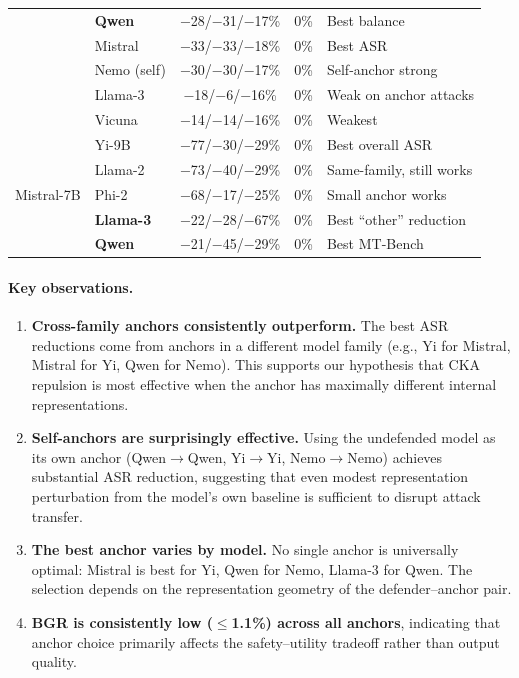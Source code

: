 \begin{table}[h]
\begin{tabular}{@{}llccl@{}}
  & \textbf{Qwen} & $-$28/$-$31/$-$17\% & 0\% & Best balance \\
  & Mistral & $-$33/$-$33/$-$18\% & 0\% & Best ASR \\
  & Nemo (self) & $-$30/$-$30/$-$17\% & 0\% & Self-anchor strong \\
  & Llama-3 & $-$18/$-$6/$-$16\% & 0\% & Weak on anchor attacks \\
  & Vicuna & $-$14/$-$14/$-$16\% & 0\% & Weakest \\
\midrule
\multirow{5}{*}{Mistral-7B}
  & Yi-9B & $-$77/$-$30/$-$29\% & 0\% & Best overall ASR \\
  & Llama-2 & $-$73/$-$40/$-$29\% & 0\% & Same-family, still works \\
  & Phi-2 & $-$68/$-$17/$-$25\% & 0\% & Small anchor works \\
  & \textbf{Llama-3} & $-$22/$-$28/$-$67\% & 0\% & Best ``other'' reduction \\
  & \textbf{Qwen} & $-$21/$-$45/$-$29\% & 0\% & Best MT-Bench \\
\bottomrule
\end{tabular}
\renewcommand{\arraystretch}{1.0}
\end{table}

\paragraph{Key observations.}
\begin{enumerate}[nosep,leftmargin=*]
    \item \textbf{Cross-family anchors consistently outperform.} The best ASR reductions come from anchors in a different model family (e.g., Yi for Mistral, Mistral for Yi, Qwen for Nemo). This supports our hypothesis that CKA repulsion is most effective when the anchor has maximally different internal representations.
    \item \textbf{Self-anchors are surprisingly effective.} Using the undefended model as its own anchor (Qwen$\to$Qwen, Yi$\to$Yi, Nemo$\to$Nemo) achieves substantial ASR reduction, suggesting that even modest representation perturbation from the model's own baseline is sufficient to disrupt attack transfer.
    \item \textbf{The best anchor varies by model.} No single anchor is universally optimal: Mistral is best for Yi, Qwen for Nemo, Llama-3 for Qwen. The selection depends on the representation geometry of the defender--anchor pair.
    \item \textbf{BGR is consistently low ($\leq$1.1\%) across all anchors}, indicating that anchor choice primarily affects the safety--utility tradeoff rather than output quality.
\end{enumerate}

